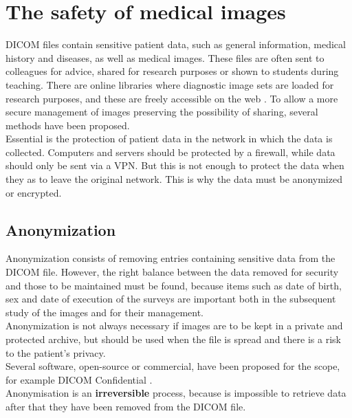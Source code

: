 \section{The safety of medical images}
DICOM files contain sensitive patient data, such as general information, medical history and diseases, as well as medical images. These files are often sent to colleagues for advice, shared for research purposes or shown to students during teaching. There are online libraries where diagnostic image sets are loaded for research purposes, and these are freely accessible on the web \parencite{Reference24}. To allow a more secure management of images preserving the possibility of sharing, several methods have been proposed. \\
Essential is the protection of patient data in the network in which the data is collected. Computers and servers should be protected by a firewall, while data should only be sent via a VPN. But this is not enough to protect the data when they as to leave the original network. This is why the data must be anonymized or encrypted.

\subsection{Anonymization}
Anonymization consists of removing entries containing sensitive data from the DICOM file. However, the right balance between the data removed for security and those to be maintained must be found, because items such as date of birth, sex and date of execution of the surveys are important both in the subsequent study of the images and for their management.\\
Anonymization is not always necessary if images are to be kept in a private and protected archive, but should be used when the file is spread and there is a risk to the patient's privacy. \\
Several software, open-source or commercial, have been proposed for the scope, for example DICOM Confidential \parencite{Reference46}. \\Anonymisation is an \textbf{irreversible} process, because is impossible to retrieve data after that they have been removed from the DICOM file.

